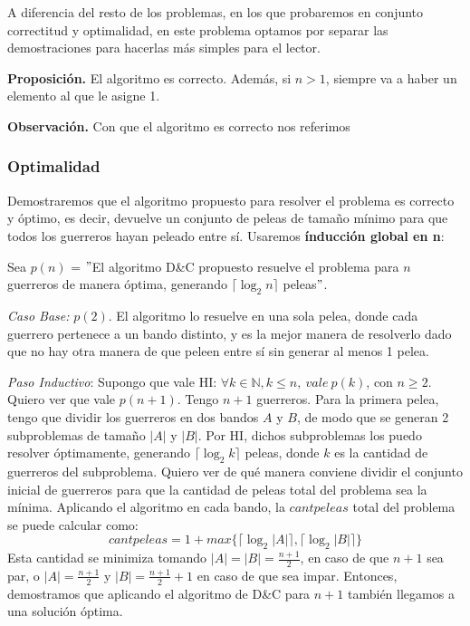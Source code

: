 A diferencia del resto de los problemas, en los que probaremos en conjunto correctitud y optimalidad, en este problema optamos por separar las demostraciones para hacerlas más simples para el lector.

\textbf{Proposición.} El algoritmo es correcto. Además, si $n > 1$, siempre va a haber un elemento al que le asigne 1.

\textbf{Observación.} Con que el algoritmo es correcto nos referimos

\subsubsection{Optimalidad}

Demostraremos que el algoritmo propuesto para resolver el problema es correcto y óptimo, es decir, devuelve un conjunto de peleas de tamaño mínimo para que todos los guerreros hayan peleado entre sí. Usaremos \textbf{índucción global en n}:

Sea $p(n)$ = $"$El algoritmo D\&C propuesto resuelve el problema para $n$ guerreros de manera óptima, generando $\lceil \log _2 n \rceil$ peleas$"$. 

\textit{Caso Base:} $p(2)$. El algoritmo lo resuelve en una sola pelea, donde cada guerrero pertenece a un bando distinto, y es la mejor manera de resolverlo dado que no hay otra manera de que peleen entre sí sin generar al menos 1 pelea.

\textit{Paso Inductivo}: Supongo que vale HI: $\forall k \in \mathbb{N}, k \leq n, \ vale \ p(k)$, con $n \geq 2$.
Quiero ver que vale $p(n+1)$.
Tengo $n+1$ guerreros. Para la primera pelea, tengo que dividir los guerreros en dos bandos $A$ y $B$, de modo que se generan 2 subproblemas de tamaño $|A|$ y $|B|$.
Por HI, dichos subproblemas los puedo resolver óptimamente, generando $\lceil \log _2 k \rceil$ peleas, donde $k$ es la cantidad de guerreros del subproblema. Quiero ver de qué manera conviene dividir el conjunto inicial de guerreros para que la cantidad de peleas total del problema sea la mínima.
Aplicando el algoritmo en cada bando, la $cantpeleas$ total del problema se puede calcular como: 
\[ cantpeleas = 1 + max\{ \lceil \log _2 |A| \rceil , \lceil \log _2 |B| \rceil \}\]
Esta cantidad se minimiza tomando $|A| = |B| = \frac{n+1}{2}$, en caso de que $n+1$ sea par, o $|A| = \frac{n+1}{2}$ y $|B| = \frac{n+1}{2} + 1$ en caso de que sea impar. Entonces, demostramos que aplicando el algoritmo de D\&C para $n+1$ también llegamos a una solución óptima.

